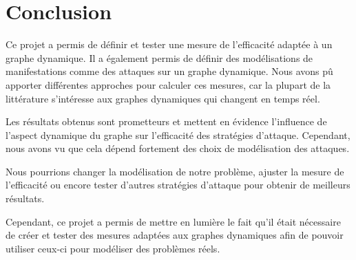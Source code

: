 \section{Conclusion} \label{sec:conclusion}

Ce projet a permis de définir et tester une mesure de l'efficacité adaptée à un graphe dynamique. 
Il a également permis de définir des modélisations de manifestations comme des attaques 
sur un graphe dynamique.
Nous avons pû apporter différentes approches pour calculer ces mesures, car la plupart de la littérature s'intéresse aux graphes dynamiques qui
changent en temps réel.

Les résultats obtenus sont prometteurs et mettent en évidence l'influence de l'aspect 
dynamique du graphe sur l'efficacité des stratégies d'attaque.
Cependant, nous avons vu que cela dépend fortement des choix de modélisation des attaques.

Nous pourrions changer la modélisation de notre problème, ajuster 
la mesure de l'efficacité ou encore tester d'autres stratégies d'attaque 
pour obtenir de meilleurs résultats. 

Cependant, ce projet a permis de mettre en lumière le fait qu'il était 
nécessaire de créer et tester des mesures adaptées aux graphes dynamiques 
afin de pouvoir utiliser ceux-ci pour modéliser des problèmes réels.